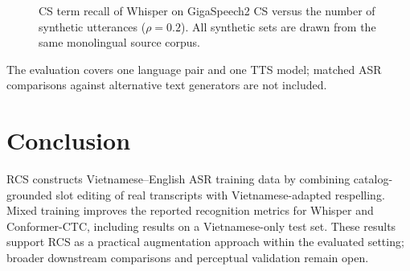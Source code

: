 \documentclass[letterpaper]{article}
\begin{document}
\begin{figure}[t]
  \centering
  \vspace{-0.7em}
  \caption{CS term recall of Whisper on GigaSpeech2 CS versus the number of
synthetic utterances ($\rho{=}0.2$). All synthetic sets are drawn from the
same monolingual source corpus.}
  \label{fig:scale}
  \vspace{-0.9em}
\end{figure}

The evaluation covers one language pair and one TTS model;
matched ASR comparisons against alternative text generators
are not included.

\section{Conclusion}
RCS constructs Vietnamese--English ASR training data by
combining catalog-grounded slot editing of real transcripts
with Vietnamese-adapted respelling. Mixed training improves
the reported recognition metrics for Whisper and
Conformer-CTC, including results on a Vietnamese-only test
set. These results support RCS as a practical augmentation
approach within
the evaluated setting; broader downstream comparisons
and perceptual validation remain open.



\end{document}
